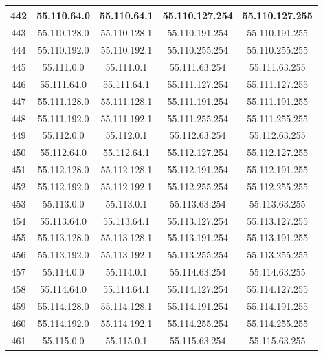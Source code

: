 \documentclass[letterpaper,12pt]{article}
\begin{document}
\begin{center}
\begin{longtable}{|c|c|c|c|c|}
                442 & 55.110.64.0 & 55.110.64.1 & 55.110.127.254 & 55.110.127.255 \\ \hline
                443 & 55.110.128.0 & 55.110.128.1 & 55.110.191.254 & 55.110.191.255 \\ \hline
                444 & 55.110.192.0 & 55.110.192.1 & 55.110.255.254 & 55.110.255.255 \\ \hline
                445 & 55.111.0.0 & 55.111.0.1 & 55.111.63.254 & 55.111.63.255 \\ \hline
                446 & 55.111.64.0 & 55.111.64.1 & 55.111.127.254 & 55.111.127.255 \\ \hline
                447 & 55.111.128.0 & 55.111.128.1 & 55.111.191.254 & 55.111.191.255 \\ \hline
                448 & 55.111.192.0 & 55.111.192.1 & 55.111.255.254 & 55.111.255.255 \\ \hline
                449 & 55.112.0.0 & 55.112.0.1 & 55.112.63.254 & 55.112.63.255 \\ \hline
                450 & 55.112.64.0 & 55.112.64.1 & 55.112.127.254 & 55.112.127.255 \\ \hline
                451 & 55.112.128.0 & 55.112.128.1 & 55.112.191.254 & 55.112.191.255 \\ \hline
                452 & 55.112.192.0 & 55.112.192.1 & 55.112.255.254 & 55.112.255.255 \\ \hline
                453 & 55.113.0.0 & 55.113.0.1 & 55.113.63.254 & 55.113.63.255 \\ \hline
                454 & 55.113.64.0 & 55.113.64.1 & 55.113.127.254 & 55.113.127.255 \\ \hline
                455 & 55.113.128.0 & 55.113.128.1 & 55.113.191.254 & 55.113.191.255 \\ \hline
                456 & 55.113.192.0 & 55.113.192.1 & 55.113.255.254 & 55.113.255.255 \\ \hline
                457 & 55.114.0.0 & 55.114.0.1 & 55.114.63.254 & 55.114.63.255 \\ \hline
                458 & 55.114.64.0 & 55.114.64.1 & 55.114.127.254 & 55.114.127.255 \\ \hline
                459 & 55.114.128.0 & 55.114.128.1 & 55.114.191.254 & 55.114.191.255 \\ \hline
                460 & 55.114.192.0 & 55.114.192.1 & 55.114.255.254 & 55.114.255.255 \\ \hline
                461 & 55.115.0.0 & 55.115.0.1 & 55.115.63.254 & 55.115.63.255 \\ \hline

\end{longtable}
\end{center}
\end{document}
